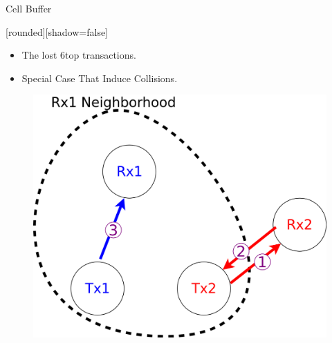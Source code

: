 \begin{withoutheadline}
\begin{frame}{Cell Buffer}


[rounded][shadow=false]


\begin{block}

    \begin{itemize}
    \item The lost 6top transactions. 
\item<2-> Special Case That Induce Collisions.
    
     
    
    \end{itemize}
    \end{block}

\centering
\begin{figure}[p]

\item<2-> \includegraphics[width=0.4\linewidth]{figures/pro.png}
\end{figure}

\end{frame}
\end{withoutheadline}



